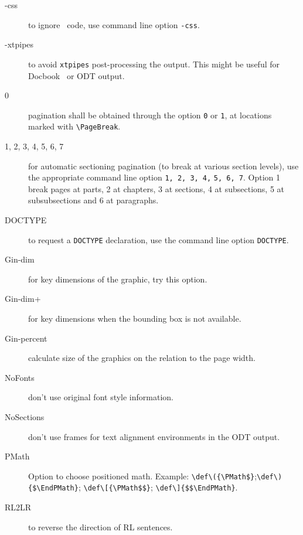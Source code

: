 \begin{description}

\item[-css] to ignore \css\ code, use command line option \verb=-css=.

\item[-xtpipes] to avoid \verb=xtpipes= post-processing the
  output. This might be useful for Docbook \xml\ or ODT output.


\item[0] pagination shall be obtained through the option \verb=0= or
  \verb=1=, at locations marked with \verb=\PageBreak=.

\item[1, 2, 3, 4, 5, 6, 7] for automatic sectioning pagination (to
  break at various section levels), use the appropriate command line
  option \verb=1, 2, 3, 4,= \verb=5, 6, 7=. Option 1 break pages
  at parts, 2 at chapters, 3 at sections, 4 at subsections,
  5 at subsubsections and 6 at paragraphs. 


\item[DOCTYPE] to request a \verb=DOCTYPE= declaration, use the
  command line option \verb=DOCTYPE=.

\item[Gin-dim] for key dimensions of the graphic, try this option.

\item[Gin-dim+] for key dimensions when the bounding box is not
  available.

\item[Gin-percent] calculate size of the graphics on the relation to the 
  page width.

\item[NoFonts] don't use original font style information.
\item[NoSections] don't use frames for text alignment environments in 
  the ODT output.

\item[PMath] Option to choose positioned math. Example: 
  \verb=\def\({\PMath$}=;\allowbreak \verb=\def\){$\EndPMath}=;
  \verb=\def\[{\PMath$$}=; \verb=\def\]{$$\EndPMath}=.

\item[RL2LR] to reverse the direction of RL sentences.



\end{description}
